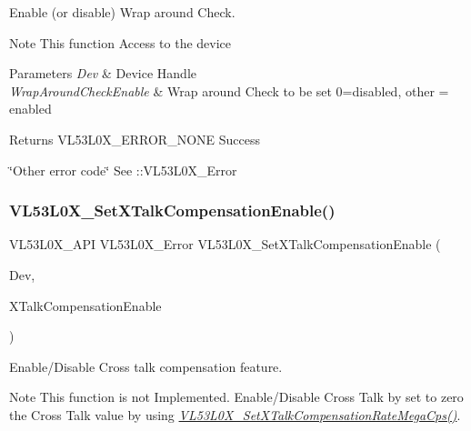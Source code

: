 Enable (or disable) Wrap around Check. 

\begin{DoxyNote}{Note}
This function Access to the device
\end{DoxyNote}

\begin{DoxyParams}{Parameters}
{\em Dev} & Device Handle \\
\hline
{\em Wrap\+Around\+Check\+Enable} & Wrap around Check to be set 0=disabled, other = enabled \\
\hline
\end{DoxyParams}
\begin{DoxyReturn}{Returns}
V\+L53\+L0\+X\+\_\+\+E\+R\+R\+O\+R\+\_\+\+N\+O\+NE Success 

\char`\"{}\+Other error code\char`\"{} See \+::\+V\+L53\+L0\+X\+\_\+\+Error 
\end{DoxyReturn}
\mbox{\label{group__VL53L0X__parameters__group_ga312b049fa776bc7a83502792a26a84d3}} 
\subsubsection{\texorpdfstring{V\+L53\+L0\+X\+\_\+\+Set\+X\+Talk\+Compensation\+Enable()}{VL53L0X\_SetXTalkCompensationEnable()}}
{\footnotesize\ttfamily V\+L53\+L0\+X\+\_\+\+A\+PI V\+L53\+L0\+X\+\_\+\+Error V\+L53\+L0\+X\+\_\+\+Set\+X\+Talk\+Compensation\+Enable (\begin{DoxyParamCaption}\item[{\hyperlink{group__VL53L0X__platform__group_ga2d6405308b1dd524b462f1b8fb97d167}{V\+L53\+L0\+X\+\_\+\+D\+EV}}]{Dev,  }\item[{\hyperlink{vl53l0x__types_8h_aba7bc1797add20fe3efdf37ced1182c5}{uint8\+\_\+t}}]{X\+Talk\+Compensation\+Enable }\end{DoxyParamCaption})}



Enable/\+Disable Cross talk compensation feature. 

\begin{DoxyNote}{Note}
This function is not Implemented. Enable/\+Disable Cross Talk by set to zero the Cross Talk value by using {\itshape \hyperlink{group__VL53L0X__parameters__group_ga5a9549bdb784e68ef58663c21542f7ad}{V\+L53\+L0\+X\+\_\+\+Set\+X\+Talk\+Compensation\+Rate\+Mega\+Cps()}}.
\end{DoxyNote}

